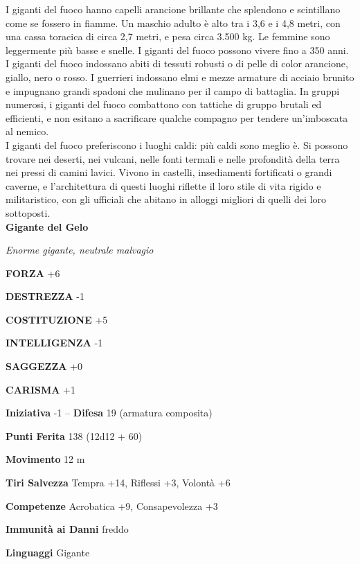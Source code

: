 \begin{multicols}{2}
I giganti del fuoco hanno capelli arancione brillante che splendono e scintillano come se fossero in fiamme. Un maschio adulto è alto tra i 3,6 e i 4,8 metri, con una cassa toracica di circa 2,7 metri, e pesa circa 3.500 kg. Le femmine sono leggermente più basse e snelle. I giganti del fuoco possono vivere fino a 350 anni.\\

I giganti del fuoco indossano abiti di tessuti robusti o di pelle di color arancione, giallo, nero o rosso. I guerrieri indossano elmi e mezze armature di acciaio brunito e impugnano grandi spadoni che mulinano per il campo di battaglia. In gruppi numerosi, i giganti del fuoco combattono con tattiche di gruppo brutali ed efficienti, e non esitano a sacrificare qualche compagno per tendere un'imboscata al nemico.\\

I giganti del fuoco preferiscono i luoghi caldi: più caldi sono meglio è. Si possono trovare nei deserti, nei vulcani, nelle fonti termali e nelle profondità della terra nei pressi di camini lavici. Vivono in castelli, insediamenti fortificati o grandi caverne, e l'architettura di questi luoghi riflette il loro stile di vita rigido e militaristico, con gli ufficiali che abitano in alloggi migliori di quelli dei loro sottoposti.\\



\medskip{}\textbf{Gigante del Gelo}

\emph{Enorme gigante, neutrale malvagio}

\textbf{FORZA} +6

\textbf{DESTREZZA} -1

\textbf{COSTITUZIONE} +5

\textbf{INTELLIGENZA} -1

\textbf{SAGGEZZA} +0

\textbf{CARISMA} +1

\textbf{Iniziativa} -1 -- \textbf{Difesa} 19 (armatura composita)

\textbf{Punti Ferita} 138 (12d12 + 60)

\textbf{Movimento} 12 m

\textbf{Tiri Salvezza} Tempra +14, Riflessi +3, Volontà +6

\textbf{Competenze} Acrobatica +9, Consapevolezza +3

\textbf{Immunità ai Danni} freddo

\textbf{Linguaggi} Gigante


\end{multicols}
